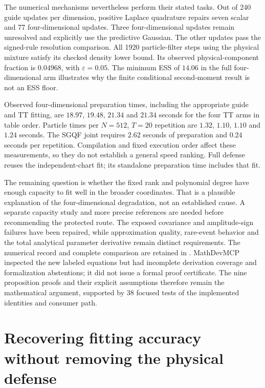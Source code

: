 \documentclass[11pt]{article}
\begin{document}
The numerical mechanisms nevertheless perform their stated tasks. Out of
240 guide updates per dimension, positive Laplace quadrature repairs seven
scalar and 77 four-dimensional updates. Three four-dimensional updates remain
unresolved and explicitly use the predictive Gaussian. The other updates
pass the signed-rule resolution comparison. All 1920 particle-filter steps
using the physical mixture satisfy its checked density lower bound. Its
observed physical-component fraction is $0.04968$, with $\varepsilon=0.05$.
The minimum ESS of $14.06$ in the full four-dimensional arm illustrates why
the finite conditional second-moment result is not an ESS floor.

Observed four-dimensional preparation times, including the appropriate guide
and TT fitting, are $18.97$, $19.48$, $21.34$ and $21.34$ seconds for the four
TT arms in table order. Particle times per $N=512$, $T=20$ repetition are
$1.32$, $1.10$, $1.10$ and $1.24$ seconds. The SGQF joint requires $2.62$
seconds of preparation and $0.24$ seconds per repetition. Compilation and
fixed execution order affect these measurements, so they do not establish
a general speed ranking. Full defense reuses the independent-chart fit;
its standalone preparation time includes that fit.

The remaining question is whether the fixed rank and polynomial degree have
enough capacity to fit well in the broader coordinates. That is a plausible
explanation of the four-dimensional degradation, not an established cause.
A separate capacity study and more precise references are needed before
recommending the protected route. The exposed covariance and amplitude-sign
failures have been repaired, while approximation quality, rare-event behavior
and the total analytical parameter derivative remain distinct requirements.
The numerical record and complete comparison are retained in
.
MathDevMCP inspected the new labeled equations but had incomplete derivation
coverage and formalization abstentions; it did not issue a formal proof
certificate. The nine proposition proofs and their explicit assumptions
therefore remain the mathematical argument, supported by 38 focused tests
of the implemented identities and consumer path.


\section{Recovering fitting accuracy without removing the physical defense}
\label{sec:protected-fitting}
\end{document}
